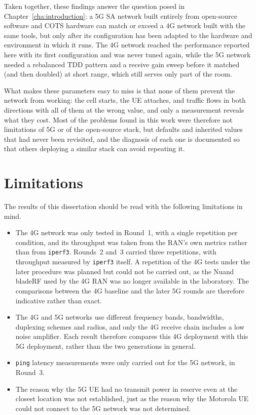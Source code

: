 Taken together, these findings answer the question posed in Chapter~\ref{cha:introduction}: a 5G \gls{SA} network built entirely from open-source software and \gls{COTS} hardware can match or exceed a 4G network built with the same tools, but only after its configuration has been adapted to the hardware and environment in which it runs. The 4G network reached the performance reported here with its first configuration and was never tuned again, while the 5G network needed a rebalanced \gls{TDD} pattern and a receive gain sweep before it matched (and then doubled) at short range, which still serves only part of the room.

What makes these parameters easy to miss is that none of them prevent the network from working: the cell starts, the \gls{UE} attaches, and traffic flows in both directions with all of them at the wrong value, and only a measurement reveals what they cost. Most of the problems found in this work were therefore not limitations of 5G or of the open-source stack, but defaults and inherited values that had never been revisited, and the diagnosis of each one is documented so that others deploying a similar stack can avoid repeating it.

\section{Limitations}
\label{sec:conclusions-limitations}

The results of this dissertation should be read with the following limitations in mind.

\begin{itemize}
    \item The 4G network was only tested in Round~1, with a single repetition per condition, and its throughput was taken from the \gls{RAN}'s own metrics rather than from \texttt{iperf3}. Rounds~2 and~3 carried three repetitions, with throughput measured by \texttt{iperf3} itself. A repetition of the 4G tests under the later procedure was planned but could not be carried out, as the Nuand bladeRF used by the 4G \gls{RAN} was no longer available in the laboratory. The comparisons between the 4G baseline and the later 5G rounds are therefore indicative rather than exact.

    \item The 4G and 5G networks use different frequency bands, bandwidths, duplexing schemes and radios, and only the 4G receive chain includes a low noise amplifier. Each result therefore compares this 4G deployment with this 5G deployment, rather than the two generations in general.
    
    \item \texttt{ping} latency measurements were only carried out for the 5G network, in Round~3.
    
    \item The reason why the 5G \gls{UE} had no transmit power in reserve even at the closest location was not established, just as the reason why the Motorola \gls{UE} could not connect to the 5G network was not determined.
\end{itemize}

